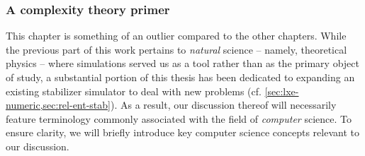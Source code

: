\subsubsection*{A complexity theory primer}
This chapter is something of an outlier compared to the other chapters. While
the previous part of this work pertains to \emph{natural} science -- namely,
theoretical physics -- where simulations served us as a tool rather than as the
primary object of study, a substantial portion of this thesis has been
dedicated to expanding an existing stabilizer simulator to deal with new
problems (cf.  \cref{sec:lxe-numeric,sec:rel-ent-stab}). As a result, our
discussion thereof will necessarily feature
terminology commonly associated with the field of \emph{computer} science.
To ensure clarity, we will briefly
introduce key computer science concepts relevant to our discussion.  

